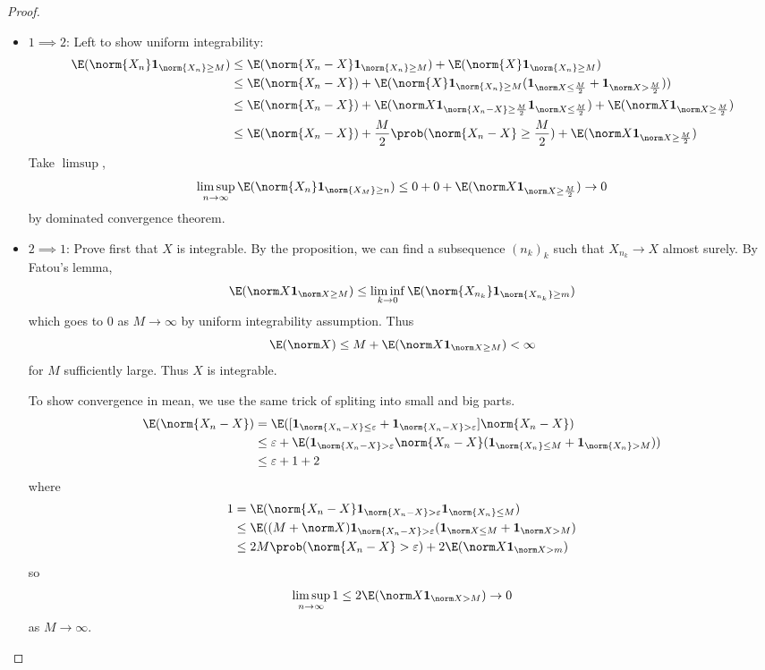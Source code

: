 \documentclass[a4paper]{article}
\renewcommand{\P}{\prob} %
\begin{document}
\begin{proof}\leavevmode
  \begin{itemize}
  \item \(1 \implies 2\): Left to show uniform integrability:
    \begin{align*}
      \E(\norm{X_n} \mathbf 1_{\norm{X_n} \geq M})
      &\leq \E(\norm{X_n - X} \mathbf 1_{\norm{X_n} \geq M}) + \E(\norm{X} \mathbf 1_{\norm{X_n} \geq M}) \\
      &\leq \E(\norm{X_n - X}) + \E(\norm{X} \mathbf 1_{\norm{X_n} \geq M} (\mathbf 1_{\norm X \leq \frac{M}{2}} + \mathbf 1_{\norm X > \frac{M}{2}})) \\
      &\leq \E(\norm{X_n - X}) + \E(\norm X \mathbf 1_{\norm{X_n - X} \geq \frac{M}{2}} \mathbf 1_{\norm X \leq \frac{M}{2}}) + \E(\norm X \mathbf 1_{\norm X \geq \frac{M}{2}}) \\
      &\leq \E(\norm{X_n - X}) + \frac{M}{2} \P(\norm{X_n - X} \geq \frac{M}{2}) + \E(\norm X \mathbf 1_{\norm X \geq \frac{M}{2}})
    \end{align*}
    Take \(\limsup\),
    \[
      \limsup_{n \to \infty} \E(\norm{X_n} \mathbf 1_{\norm{X_M} \geq n})
      \leq 0 + 0 + \E(\norm X \mathbf 1_{\norm X \geq \frac{M}{2}})
      \to 0
    \]
    by dominated convergence theorem.
  \item \(2 \implies 1\): Prove first that \(X\) is integrable. By the proposition, we can find a subsequence \((n_k)_k\) such that \(X_{n_k} \to X\) almost surely. By Fatou's lemma,
    \[
      \E(\norm X \mathbf 1_{\norm X \geq M}) \leq \liminf_{k \to 0} \E(\norm{X_{n_k}} \mathbf 1_{\norm{X_{n_k}} \geq m})
    \]
    which goes to \(0\) as \(M \to \infty\) by uniform integrability assumption. Thus
    \[
      \E(\norm X) \leq M + \E(\norm X \mathbf 1_{\norm X \geq M}) < \infty
    \]
    for \(M\) sufficiently large. Thus \(X\) is integrable.

    To show convergence in mean, we use the same trick of spliting into small and big parts.
    \begin{align*}
      \E(\norm{X_n - X})
      &= \E([\mathbf 1_{\norm{X_n - X} \leq \varepsilon} + \mathbf 1_{\norm{X_n - X} > \varepsilon}] \norm{X_n - X}) \\
      &\leq \varepsilon + \E(\mathbf 1_{\norm{X_n - X} > \varepsilon} \norm{X_n - X} (\mathbf 1_{\norm{X_n} \leq M} + \mathbf 1_{\norm{X_n} > M})) \\
      &\leq \varepsilon + 1 + 2
    \end{align*}
    where
    \begin{align*}
      1
      &= \E(\norm{X_n - X} \mathbf 1_{\norm{X_n - X} > \varepsilon} \mathbf 1_{\norm{X_n} \leq M}) \\
      &\leq \E((M + \norm X) \mathbf 1_{\norm{X_n - X} > \varepsilon} (\mathbf 1_{\norm X \leq M} + \mathbf 1_{\norm X > M}) \\
      &\leq 2M \P(\norm{X_n - X} > \varepsilon) + 2 \E(\norm X \mathbf 1_{\norm X > m})
    \end{align*}
    so
    \[
      \limsup_{n \to \infty} 1 \leq 2 \E(\norm X \mathbf 1_{\norm X > M}) \to 0
    \]
    as \(M \to \infty\).


\end{itemize}
\end{proof}
\end{document}
